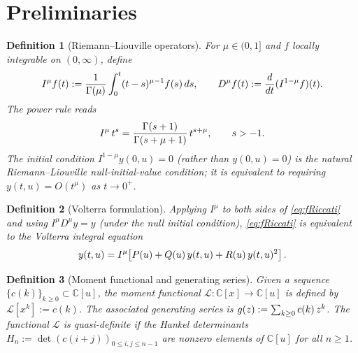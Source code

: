 \documentclass{article}
\newcommand{\assign}{:=}
\newcommand{\tmem}[1]{{\em #1\/}}
\newtheorem{definition}{Definition}
\newcommand{\C}{\mathbb{C}}
\newcommand{\Lk}{\mathcal{L}}
\begin{document}
\section{Preliminaries}\label{sec:prelim}

\begin{definition}
  [Riemann--Liouville operators]\label{def:RL}For $\mu \in (0, 1]$ and $f$
  locally integrable on $(0, \infty)$, define
  \[ I^{\mu} f (t) \assign \frac{1}{\Gamma (\mu)}  \int_0^t (t - s)^{\mu - 1}
     f (s)  \hspace{0.17em} ds, \qquad D^{\mu} f (t) \assign \frac{d}{dt} 
     (I^{1 - \mu} f) (t) . \]
  The power rule reads
  \begin{equation}
    I^{\mu}  \hspace{0.17em} t^s = \frac{\Gamma (s + 1)}{\Gamma (s + \mu + 1)}
    \hspace{0.17em} t^{s + \mu}, \qquad s > - 1. \label{eq:powerrule}
  \end{equation}
  The initial condition $I^{1 - \mu} y (0, u) = 0$ (rather than $y (0, u) =
  0$) is the natural Riemann--Liouville null-initial-value condition; it is
  equivalent to requiring $y (t, u) = O (t^{\mu})$ as $t \to 0^+$.
\end{definition}

\begin{definition}
  [Volterra formulation]\label{def:Volterra}Applying $I^{\mu}$ to both sides
  of \eqref{eq:fRiccati} and using $I^{\mu} D^{\mu} y = y$ (under the null
  initial condition), \eqref{eq:fRiccati} is equivalent to the Volterra
  integral equation
  \begin{equation}
    y (t, u) = I^{\mu}  \hspace{-0.17em} \left[ P (u) + Q (u) \hspace{0.17em}
    y (t, u) + R (u) \hspace{0.17em} y (t, u)^2 \right] . \label{eq:Volterra}
  \end{equation}
\end{definition}

\begin{definition}
  [Moment functional and generating series]\label{def:moment}Given a sequence
  $\{c (k)\}_{k \ge 0} \subset \C [u]$, the {\tmem{moment functional}} $\Lk :
  \C [x] \to \C [u]$ is defined by $\Lk [x^k] \assign c (k)$. The associated
  {\tmem{generating series}} is $g (z) \assign \sum_{k \ge 0} c (k) 
  \hspace{0.17em} z^k$. The functional $\Lk$ is {\tmem{quasi-definite}} if the
  Hankel determinants $H_n \assign \det (c (i + j))_{0 \le i, j \le n - 1}$
  are nonzero elements of $\C [u]$ for all $n \ge 1$.
\end{definition}
\end{document}

